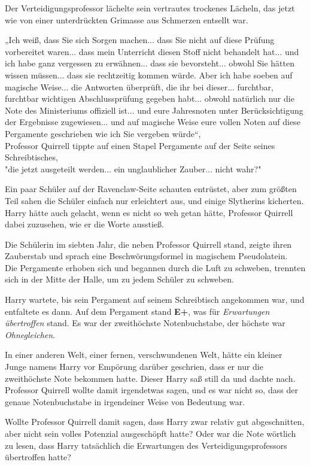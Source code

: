 {Der Verteidigungsprofessor lächelte sein vertrautes trockenes Lächeln, das jetzt wie von einer unterdrückten Grimasse aus Schmerzen entsellt war.

„Ich weiß, dass Sie sich Sorgen machen... dass Sie nicht auf diese Prüfung vorbereitet waren... dass mein Unterricht diesen Stoff nicht behandelt hat... und ich habe ganz vergessen zu erwähnen... dass sie bevorsteht... obwohl Sie hätten wissen müssen... dass sie rechtzeitig kommen würde. Aber ich habe soeben auf magische Weise... die Antworten überprüft, die ihr bei dieser... furchtbar, furchtbar wichtigen Abschlussprüfung gegeben habt... obwohl natürlich nur die Note des Ministeriums offiziell ist... und eure Jahresnoten unter Berücksichtigung der Ergebnisse zugewiesen... und auf magische Weise eure vollen Noten auf diese Pergamente geschrieben wie ich Sie vergeben würde“,\\ Professor Quirrell tippte auf einen Stapel Pergamente auf der Seite seines Schreibtisches,\\ "die jetzt ausgeteilt werden... ein unglaublicher Zauber... nicht wahr?"

Ein paar Schüler auf der Ravenclaw-Seite schauten entrüstet, aber zum größten Teil sahen die Schüler einfach nur erleichtert aus, und einige Slytherins kicherten. Harry hätte auch gelacht, wenn es nicht so weh getan hätte, Professor Quirrell dabei zuzusehen, wie er die Worte ausstieß.

Die Schülerin im siebten Jahr, die neben Professor Quirrell stand, zeigte ihren Zauberstab und sprach eine Beschwörungsformel in magischem Pseudolatein.\\ Die Pergamente erhoben sich und begannen durch die Luft zu schweben, trennten sich in der Mitte der Halle, um zu jedem Schüler zu schweben.

Harry wartete, bis sein Pergament auf seinem Schreibtisch angekommen war, und entfaltete es dann. Auf dem Pergament stand \textbf{E+}, was für \emph{Erwartungen übertroffen} stand. Es war der zweithöchste Notenbuchstabe, der höchste war \emph{Ohnegleichen}.

In einer anderen Welt, einer fernen, verschwundenen Welt, hätte ein kleiner Junge namens Harry vor Empörung darüber geschrien, dass er nur die zweithöchste Note bekommen hatte. Dieser Harry saß still da und dachte nach. Professor Quirrell wollte damit irgendetwas sagen, und es war nicht so, dass der genaue Notenbuchstabe in irgendeiner Weise von Bedeutung war.

Wollte Professor Quirrell damit sagen, dass Harry zwar relativ gut abgeschnitten, aber nicht sein volles Potenzial ausgeschöpft hatte? Oder war die Note wörtlich zu lesen, dass Harry tatsächlich die Erwartungen des Verteidigungsprofessors übertroffen hatte?

}
